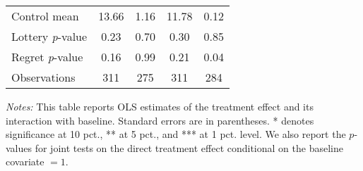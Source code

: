 \begin{table}[htbp]
{\begin{threeparttable}
\begin{tabular}{l*{4}{c}}
Control mean    &    13.66         &     1.16         &    11.78         &     0.12         \\
Lottery \emph{p}-value&     0.23         &     0.70         &     0.30         &     0.85         \\
Regret \emph{p}-value&     0.16         &     0.99         &     0.21         &     0.04         \\
Observations    &      311         &      275         &      311         &      284         \\
\bottomrule \end{tabular} \begin{tablenotes}[flushleft] \footnotesize \item \emph{Notes:} This table reports OLS estimates of the treatment effect and its interaction with baseline. Standard errors are in parentheses. * denotes significance at 10 pct., ** at 5 pct., and *** at 1 pct. level. We also report the \(p\)-values for joint tests on the direct treatment effect conditional on the baseline covariate $= 1$. \end{tablenotes} \end{threeparttable} } \end{table}

